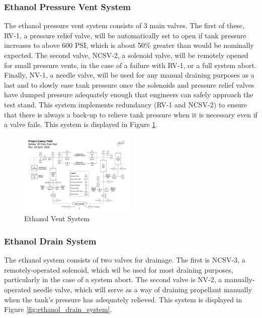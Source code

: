 \documentclass[9pt]{article} %
\numberwithin{equation}{section} %
\begin{document}
\subsubsection{Ethanol Pressure Vent System}
\hspace{\parindent} The ethanol pressure vent system consists of 3 main valves. The first of these, RV-1, a pressure relief valve, will be automatically set to open if tank pressure increases to above 600 PSI, which is about 50\% greater than would be nominally expected. The second valve, NCSV-2, a solenoid valve, will be remotely opened for small pressure vents, in the case of a failure with RV-1, or a full system abort. Finally, NV-1, a needle valve, will be used for any manual draining purposes as a last and to slowly ease tank pressure once the solenoids and pressure relief valves have dumped pressure adequately enough that engineers can safely approach the test stand. This system implements redundancy (RV-1 and NCSV-2) to ensure that there is always a back-up to relieve tank pressure when it is necessary even if a valve fails. This system is displayed in Figure \ref{fig:ethanol_vent_system}.

\begin{figure}[!htb] 
    \centering
    \includegraphics[scale=0.5, width=0.5\textwidth, trim={15cm 18cm 18.3cm 5cm}, clip]{Aphlex1B_04-02-2020_P&ID.pdf} %
    \caption{Ethanol Vent System}
    \label{fig:ethanol_vent_system}
\end{figure}

\subsubsection{Ethanol Drain System}
\hspace{\parindent} The ethanol system consists of two valves for drainage. The first is NCSV-3, a remotely-operated solenoid, which wil be used for most draining purposes, particularly in the case of a system abort. The second valve is NV-2, a manually-operated needle valve, which will serve as a way of draining propellant manually when the tank's pressure has adequately relieved. This system is displayed in Figure \ref{fig:ethanol_drain_system}.
\end{document}
